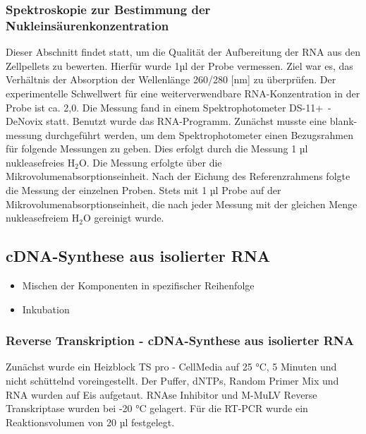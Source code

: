 \documentclass{article}
\begin{document}
\subsubsection*{Spektroskopie zur Bestimmung der Nukleinsäurenkonzentration}

Dieser Abschnitt findet statt, um die Qualität der
Aufbereitung der RNA aus den Zellpellets zu bewerten.
Hierfür wurde 1µl der Probe vermessen. Ziel war es,
das Verhältnis der Absorption der Wellenlänge 260/280 [nm] zu überprüfen.
Der experimentelle Schwellwert für eine weiterverwendbare RNA-Konzentration
in der Probe ist ca. 2,0. Die Messung fand in einem Spektrophotometer
\mbox{DS-11+ -DeNovix} statt. Benutzt wurde das RNA-Programm.
Zunächst musste eine blank-messung durchgeführt werden,
um dem Spektrophotometer einen Bezugsrahmen für folgende Messungen zu geben.
Dies erfolgt durch die Messung 1 µl nukleasefreies H$_2$O. Die Messung
erfolgte über die Mikrovolumenabsorptionseinheit. Nach der Eichung des
Referenzrahmens folgte die Messung der einzelnen Proben. Stets mit 1 µl
Probe auf der Mikrovolumenabsorptionseinheit, die nach jeder Messung mit
der gleichen Menge nukleasefreiem H$_2$O gereinigt wurde. 

\subsection{cDNA-Synthese aus isolierter RNA}

\begin{itemize}
    \item Mischen der Komponenten in spezifischer Reihenfolge
    \item Inkubation
\end{itemize}

\subsubsection*{Reverse Transkription - cDNA-Synthese aus isolierter RNA}

Zunächst wurde ein Heizblock TS pro - CellMedia auf 25 °C,
5 Minuten und nicht schüttelnd voreingestellt. Der Puffer,
dNTPs, Random Primer Mix und RNA wurden auf Eis aufgetaut.
RNAse Inhibitor und M-MuLV Reverse Transkriptase wurden bei -20 °C gelagert.
Für die RT-PCR wurde ein Reaktionsvolumen von 20 µl festgelegt.
\end{document}
